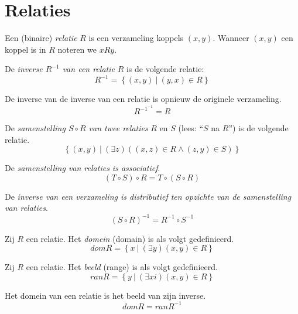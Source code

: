 \documentclass[main.tex]{subfiles}
\begin{document}
\chapter{Relaties}
\label{cha:relaties}

\begin{de}
  Een (binaire) \emph{relatie} $R$ is een verzameling koppels $(x,y)$.
  Wanneer $(x,y)$ een koppel is in $R$ noteren we $x R y$.
\end{de}

\begin{de}
  De \emph{inverse $R^{-1}$ van een relatie} $R$ is de volgende relatie:
  \[ R^{-1} = \left\{ (x,y)\ |\ (y,x) \in R \right\} \]
\end{de}

\begin{st}
  De inverse van de inverse van een relatie is opnieuw de originele verzameling.
  \[ R^{-1^{-1}} = R \]
\end{st}

\begin{de}
  De \emph{samenstelling $S \circ R$ van twee relaties} $R$ en $S$ (lees: ``$S$ na $R$'') is de volgende relatie.
  \[ \left\{ (x,y) \ |\ (\exists z) ((x,z) \in R \wedge (z,y) \in S) \right\} \]
\end{de}

\begin{st}
  De \emph{samenstelling van relaties is associatief}.
  \[ (T \circ S) \circ R = T \circ (S \circ R) \]
\end{st}

\begin{st}
  De \emph{inverse van een verzameling is distributief ten opzichte van de samenstelling van relaties}.
  \[ (S \circ R)^{-1} = R^{-1} \circ S^{-1} \]
\end{st}

\begin{de}
  Zij $R$ een relatie. Het \emph{domein} (domain) is als volgt gedefinieerd.
  \[ dom R = \left\{ x \ |\ (\exists y)(x,y) \in R \right\} \]
\end{de}

\begin{de}
  Zij $R$ een relatie. Het \emph{beeld} (range) is als volgt gedefinieerd.
  \[ ran R = \left\{ y \ |\ (\exists xi)(x,y) \in R \right\} \]
\end{de}

\begin{st}
  Het domein van een relatie is het beeld van zijn inverse.
  \[ dom R = ran R^{-1} \]
\end{st}
\end{document}
